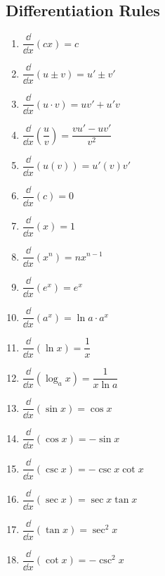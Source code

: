 

\subsection{Differentiation Rules}

\bgroup
\footnotesize
\renewcommand{\arraystretch}{2.5}
\setlength{\columnsep}{6pt}
\noindent{}
\parbox{.2\linewidth}{%
\begin{enumerate}
\item $\dfrac\dd{\dd x}(cx)=c$
\item $\dfrac\dd{\dd x}(u\pm v)=u'\pm v'$
\item $\dfrac\dd{\dd x}(u\cdot v)=uv'+u'v$%
\item $\dfrac\dd{\dd x}\left(\dfrac uv\right)=\dfrac{vu'-uv'}{v^2}$
\item $\dfrac\dd{\dd x}(u(v))=u'(v)v'$
\item $\dfrac\dd{\dd x}(c)=0$
\item $\dfrac\dd{\dd x}(x)=1$
\item $\dfrac\dd{\dd x}(x^n)=nx^{n-1}$
\item $\dfrac\dd{\dd x}(e^x)=e^x$
\end{enumerate}}\hfill
\parbox{.22\linewidth}{%
\begin{enumerate}\setcounter{enumi}{9}
\item $\dfrac\dd{\dd x}(a^x)=\ln a\cdot a^x$
\item $\dfrac\dd{\dd x}(\ln x)=\dfrac1x$
\item $\dfrac\dd{\dd x}(\log_a x)=\dfrac1{x\ln a}$
\item $\dfrac\dd{\dd x}(\sin x)=\cos x$
\item $\dfrac\dd{\dd x}(\cos x)=-\sin x$
\item $\dfrac\dd{\dd x}(\csc x)=-\csc x\cot x$%
\item $\dfrac\dd{\dd x}(\sec x)=\sec x\tan x$
\item $\dfrac\dd{\dd x}(\tan x)=\sec^2x$
\item $\dfrac\dd{\dd x}(\cot x)=-\csc^2x$
\end{enumerate}}\hfill
